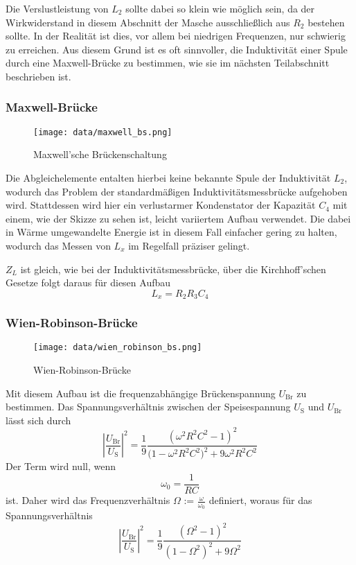 Die Verslustleistung von $L_2$ sollte dabei so klein wie möglich sein, da der Wirkwiderstand in diesem Abschnitt
der Masche
ausschließlich aus $R_2$ bestehen sollte. In der Realität ist dies, vor allem bei niedrigen Frequenzen, nur schwierig 
zu erreichen. Aus diesem Grund ist es oft sinnvoller, die Induktivität einer Spule durch eine Maxwell-Brücke zu 
bestimmen, wie sie im nächsten Teilabschnitt beschrieben ist.

\subsubsection{Maxwell-Brücke}

\begin{figure}
\centering
\texttt{[image: data/maxwell\_bs.png]}
\caption{Maxwell'sche Brückenschaltung}
\label{fig:maxwell}
\end{figure}
Die Abgleichelemente entalten hierbei keine bekannte Spule der Induktivität $L_2$, wodurch das Problem der 
standardmäßigen Induktivitätsmessbrücke aufgehoben wird. Stattdessen wird hier ein verlustarmer Kondenstator
der Kapazität $C_4$ mit einem, wie der Skizze zu sehen ist, leicht variiertem Aufbau verwendet. Die dabei
in Wärme umgewandelte Energie ist in diesem Fall einfacher gering zu halten, wodurch das Messen von $L_x$
im Regelfall präziser gelingt.

$Z_L$ ist gleich, wie bei der Induktivitätsmessbrücke, über die Kirchhoff'schen Gesetze folgt daraus für
diesen Aufbau \begin{equation}
\label{eqn:maxwell}
    L_x = R_2 R_3 C_4
\end{equation}

\subsubsection{Wien-Robinson-Brücke}
\label{sec:wien}
\begin{figure}
\centering
\texttt{[image: data/wien\_robinson\_bs.png]}
\caption{Wien-Robinson-Brücke}
\label{fig:wien}
\end{figure}
Mit diesem Aufbau ist die frequenzabhängige Brückenspannung $U_{\text{Br}}$ zu bestimmen. Das Spannungsverhältnis
zwischen der Speisespannung $U_{\text{S}}$ und $U_{\text{Br}}$ lässt sich durch \begin{equation}
    \left|\frac{U_{\text{Br}}}{U_{\text{S}}}\right|^2 = \frac{1}{9}\frac{(\omega^2 R^2 C^2 -1)^2}{\bigl (1- \omega^2 R^2 C^2\bigr)^2 + 9\omega^2 R^2 C^2} 	
\end{equation}
Der Term wird null, wenn \begin{equation}
    \omega_0 = \frac{1}{RC}
\end{equation} ist. Daher wird das Frequenzverhältnis $\Omega$ := $\frac{\omega}{\omega_0}$ definiert, woraus für das
Spannungsverhältnis \begin{equation}
\label{eqn:u}
    \left|\frac{U_{\text{Br}}}{U_{\text{S}}}\right|^2 = \frac{1}{9}\frac{(\Omega^2 -1)^2}{(1- \Omega^2)^2 + 9\Omega^2}
\end{equation}

